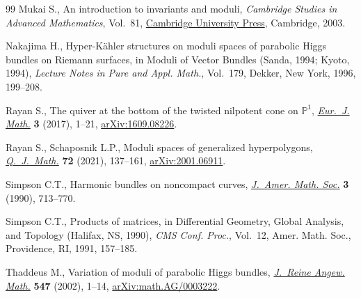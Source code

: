 \documentclass[pdftex]{sigma}
\numberwithin{equation}{section}
\begin{document}
\begin{thebibliography}{99}
Mukai S., An introduction to invariants and moduli, \textit{Cambridge Studies
 in Advanced Mathematics}, Vol.~81, \href{https://doi.org/10.1017/CBO9781316257074}{Cambridge University Press}, Cambridge,
 2003.

Nakajima H., Hyper-{K}\"ahler structures on moduli spaces of parabolic {H}iggs
 bundles on {R}iemann surfaces, in Moduli of Vector Bundles ({S}anda, 1994;
 {K}yoto, 1994), \textit{Lecture Notes in Pure and Appl. Math.}, Vol.~179,
 Dekker, New York, 1996, 199--208.

Rayan S., The quiver at the bottom of the twisted nilpotent cone on
 {$\mathbb{P}^1$}, \href{https://doi.org/10.1007/s40879-016-0120-6}{\textit{Eur.~J. Math.}} \textbf{3} (2017), 1--21,
 \href{https://arxiv.org/abs/1609.08226}{arXiv:1609.08226}.

Rayan S., Schaposnik L.P., Moduli spaces of generalized hyperpolygons,
 \href{https://doi.org/10.1093/qmath/haaa036}{\textit{Q.~J.~Math.}} \textbf{72} (2021), 137--161, \href{https://arxiv.org/abs/2001.06911}{arXiv:2001.06911}.

Simpson C.T., Harmonic bundles on noncompact curves, \href{https://doi.org/10.2307/1990935}{\textit{J.~Amer. Math.
 Soc.}} \textbf{3} (1990), 713--770.

Simpson C.T., Products of matrices, in Differential Geometry, Global Analysis,
 and Topology ({H}alifax, {NS}, 1990), \textit{CMS Conf. Proc.}, Vol.~12,
 Amer. Math. Soc., Providence, RI, 1991, 157--185.

Thaddeus M., Variation of moduli of parabolic {H}iggs bundles, \href{https://doi.org/10.1515/crll.2002.051}{\textit{J.~Reine
 Angew. Math.}} \textbf{547} (2002), 1--14, \href{https://arxiv.org/abs/math.AG/0003222}{arXiv:math.AG/0003222}.

\end{thebibliography}\LastPageEnding
\end{document}
